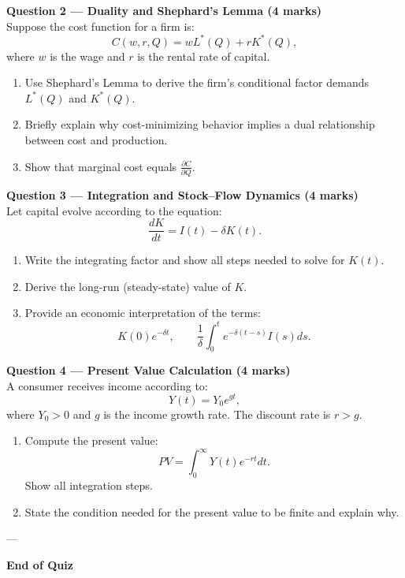 \documentclass[12pt]{article}
\begin{document}
\vspace{1em}

\textbf{Question 2 — Duality and Shephard’s Lemma (4 marks)}\\
Suppose the cost function for a firm is:
\[
C(w,r,Q) = wL^*(Q) + rK^*(Q),
\]
where $w$ is the wage and $r$ is the rental rate of capital.

\begin{enumerate}
\item Use Shephard’s Lemma to derive the firm's conditional factor demands $L^*(Q)$ and $K^*(Q)$.  
\item Briefly explain why cost-minimizing behavior implies a dual relationship between cost and production.  
\item Show that marginal cost equals $\displaystyle \frac{\partial C}{\partial Q}$.  
\end{enumerate}

\vspace{1em}

\textbf{Question 3 — Integration and Stock–Flow Dynamics (4 marks)}\\
Let capital evolve according to the equation:
\[
\frac{dK}{dt}=I(t)-\delta K(t).
\]

\begin{enumerate}
\item Write the integrating factor and show all steps needed to solve for $K(t)$.  
\item Derive the long-run (steady-state) value of $K$.  
\item Provide an economic interpretation of the terms:
\[
K(0)e^{-\delta t}, \qquad \frac{1}{\delta}\int_0^t e^{-\delta (t-s)}I(s)ds.
\]
\end{enumerate}

\vspace{1em}

\textbf{Question 4 — Present Value Calculation (4 marks)}\\
A consumer receives income according to:
\[
Y(t)=Y_0 e^{gt},
\]
where $Y_0>0$ and $g$ is the income growth rate. The discount rate is $r>g$.

\begin{enumerate}
\item Compute the present value:
\[
PV=\int_0^\infty Y(t) e^{-rt} dt.
\]
Show all integration steps.  
\item State the condition needed for the present value to be finite and explain why.  
\end{enumerate}

---

\textbf{End of Quiz}
\end{document}
